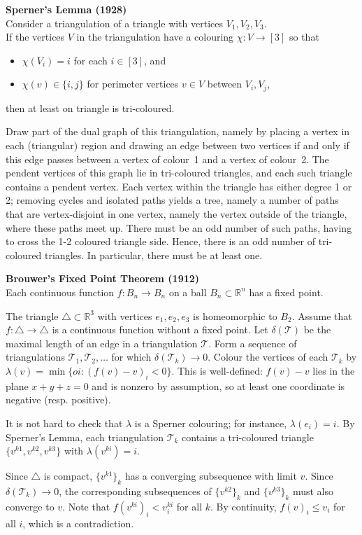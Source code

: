 \documentclass[a4paper]{article}
\let\oldendproof\endproof
\renewenvironment{proof}[1][\proofname]{%
  \oldproof[\scshape \noindent {\bfseries \text{Proof}}]%
}{\oldendproof}
\newenvironment{thm}[1]{
	\begin{framed}
	\noindent
	{\bfseries #1}\\}{\setlength{\itemsep}{0pt}
	\end{framed}
}
\newcommand{\RR}{\mathbb{R}}
\newcommand{\Tf}{\mathcal{T}}
\begin{document}
\begin{thm}{Sperner's Lemma (1928)}
Consider a triangulation of a triangle with vertices $V_1, V_2, V_3$.\\
If the vertices $V$ in the triangulation have a colouring $\chi : V \to [3]$ so that
	\begin{itemize}
		\item $\chi(V_i) = i$ for each $i \in [3]$, and
		\item $\chi(v) \in \{i,j\}$ for perimeter vertices $v \in V$ between $V_i, V_j$,
	\end{itemize}
	then at least on triangle is tri-coloured.
\end{thm}
\begin{proof}
Draw part of the dual graph of this triangulation,
namely by placing a vertex in each (triangular) region
and drawing an edge between two vertices if and only if this edge passes between a vertex of colour~1 and a vertex of colour~2.
The pendent vertices of this graph lie in tri-coloured triangles, and each such triangle contains a pendent vertex.
Each vertex within the triangle has either degree 1 or 2;
removing cycles and isolated paths yields a tree,
namely a number of paths that are vertex-disjoint in one vertex,
namely the vertex outside of the triangle, where these paths meet up.
There must be an odd number of such paths, having to cross the 1-2 coloured triangle side.
Hence, there is an odd number of tri-coloured triangles.
In particular, there must be at least one.
\end{proof}

\newpage
\begin{thm}{Brouwer's Fixed Point Theorem (1912)}
Each continuous function $f: B_n \to B_n$ on a ball $B_n \subset \RR^n$ has a fixed point.
\end{thm}

\begin{proof} The triangle $\triangle \subset \RR^3$ with vertices $e_1, e_2, e_3$ is
homeomorphic to $B_2$. Assume that $f: \triangle \to \triangle$ is a continuous function
without a fixed point. Let $\delta(\Tf)$ be the maximal length of an edge in a triangulation
$\Tf$. Form a sequence of triangulations $\Tf_1, \Tf_2, \dots$ for which $\delta(\Tf_k) \to
0$. Colour the vertices of each $\Tf_k$ by $\lambda(v) = \min\{ oi : (f(v) - v)_i < 0\}$. This
is well-defined: $f(v)-v$ lies in the plane $x+y+z =0 $ and is nonzero by assumption, so at
least one coordinate is negative (resp. positive).

It is not hard to check that $\lambda$ is a Sperner colouring; for instance, $\lambda(e_i) =
i$. By Sperner's Lemma, each triangulation $\Tf_k$ contains a tri-coloured triangle $\{v^{k1},
v^{k2}, v^{k3}\}$ with $\lambda(v^{ki}) = i$.

Since $\triangle$ is compact, $\{v^{k1}\}_k$ has a converging subsequence with limit $v$.
Since $\delta(\Tf_k) \to 0$, the corresponding subsequences of $\{v^{k2}\}_k$ and
$\{v^{k3}\}_k$ must also converge to $v$. Note that $f(v^{ki})_i < v_i^{ki}$ for all $k$. By
continuity, $f(v)_i \leq v_i$ for all $i$, which is a contradiction.
\end{proof}
\end{document}

